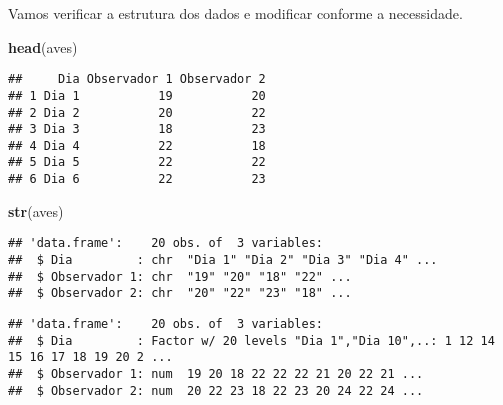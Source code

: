 \documentclass[14pt,titlepage, oneside, openany, a4paper]{book}
\newenvironment{Shaded}{\begin{snugshade}}{\end{snugshade}}
\newcommand{\DataTypeTok}[1]{\textcolor[rgb]{0.13,0.29,0.53}{#1}}
\newcommand{\KeywordTok}[1]{\textcolor[rgb]{0.13,0.29,0.53}{\textbf{#1}}}
\newcommand{\NormalTok}[1]{#1}
\newcommand{\OperatorTok}[1]{\textcolor[rgb]{0.81,0.36,0.00}{\textbf{#1}}}
\newcommand{\StringTok}[1]{\textcolor[rgb]{0.31,0.60,0.02}{#1}}
\begin{document}
Vamos verificar a estrutura dos dados e modificar conforme a necessidade.

\begin{Shaded}
\begin{Highlighting}[]
\KeywordTok{head}\NormalTok{(aves)}
\end{Highlighting}
\end{Shaded}

\begin{verbatim}
##     Dia Observador 1 Observador 2
## 1 Dia 1           19           20
## 2 Dia 2           20           22
## 3 Dia 3           18           23
## 4 Dia 4           22           18
## 5 Dia 5           22           22
## 6 Dia 6           22           23
\end{verbatim}

\begin{Shaded}
\begin{Highlighting}[]
\KeywordTok{str}\NormalTok{(aves)}
\end{Highlighting}
\end{Shaded}

\begin{verbatim}
## 'data.frame':    20 obs. of  3 variables:
##  $ Dia         : chr  "Dia 1" "Dia 2" "Dia 3" "Dia 4" ...
##  $ Observador 1: chr  "19" "20" "18" "22" ...
##  $ Observador 2: chr  "20" "22" "23" "18" ...
\end{verbatim}

\begin{Shaded}
\end{Shaded}

\begin{verbatim}
## 'data.frame':    20 obs. of  3 variables:
##  $ Dia         : Factor w/ 20 levels "Dia 1","Dia 10",..: 1 12 14 15 16 17 18 19 20 2 ...
##  $ Observador 1: num  19 20 18 22 22 22 21 20 22 21 ...
##  $ Observador 2: num  20 22 23 18 22 23 20 24 22 24 ...
\end{verbatim}
\end{document}
